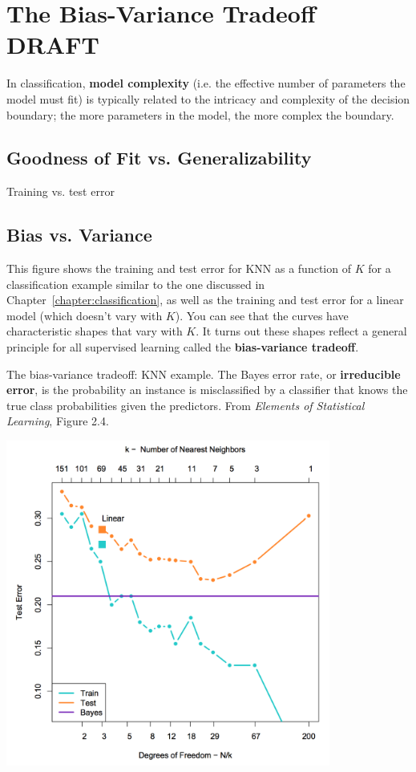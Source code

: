 \chapter{The Bias-Variance Tradeoff {\color{red} DRAFT} \label{chapter:biasvariance}}

In classification, \textbf{model complexity} (i.e. the effective number of parameters the model must fit) is typically related to the intricacy and complexity of the decision boundary; the more parameters in the model, the more complex the boundary.

\section{Goodness of Fit vs. Generalizability}

Training vs. test error

\section{Bias vs. Variance}

This figure shows the training and test error for KNN as a function of $K$ for a classification example similar to the one discussed in Chapter~\ref{chapter:classification}, as well as the training and test error for a linear model (which doesn't vary with $K$). You can see that the curves have characteristic shapes that vary with $K$. It turns out these shapes reflect a general principle for all supervised learning called the \textbf{bias-variance tradeoff}. 

The bias-variance tradeoff: KNN example. The Bayes error rate, or \textbf{irreducible error}, is the probability an instance is misclassified by a classifier that knows the true class probabilities given the predictors. From \emph{Elements of Statistical Learning}, Figure 2.4.

\begin{center}
\includegraphics[width=0.8\textwidth]{img/l03-knn-linear-tradeoff.png}
\end{center}


